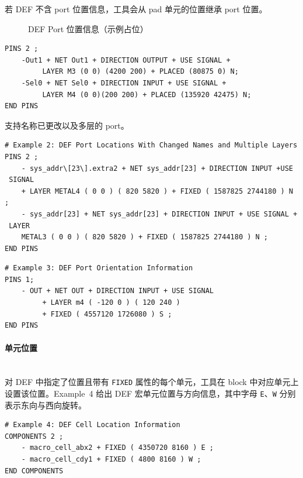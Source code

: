 \begin{noteBox}
若 DEF 不含 port 位置信息，工具会从 pad 单元的位置继承 port 位置。
\end{noteBox}

\begin{figure}[htbp]
\centering
{}
\caption{DEF Port 位置信息（示例占位）}
\label{ex:def-port-loc}
\end{figure}

\begin{lstlisting}
PINS 2 ;
    -Out1 + NET Out1 + DIRECTION OUTPUT + USE SIGNAL +
         LAYER M3 (0 0) (4200 200) + PLACED (80875 0) N;
    -Sel0 + NET Sel0 + DIRECTION INPUT + USE SIGNAL +
         LAYER M4 (0 0)(200 200) + PLACED (135920 42475) N;
END PINS
\end{lstlisting}

支持名称已更改以及多层的 port。

\begin{lstlisting}
# Example 2: DEF Port Locations With Changed Names and Multiple Layers
PINS 2 ;
    - sys_addr\[23\].extra2 + NET sys_addr[23] + DIRECTION INPUT +USE
 SIGNAL
    + LAYER METAL4 ( 0 0 ) ( 820 5820 ) + FIXED ( 1587825 2744180 ) N ;
    - sys_addr[23] + NET sys_addr[23] + DIRECTION INPUT + USE SIGNAL +
 LAYER
    METAL3 ( 0 0 ) ( 820 5820 ) + FIXED ( 1587825 2744180 ) N ;
END PINS
\end{lstlisting}

\begin{lstlisting}
# Example 3: DEF Port Orientation Information
PINS 1;
    - OUT + NET OUT + DIRECTION INPUT + USE SIGNAL
         + LAYER m4 ( -120 0 ) ( 120 240 )
         + FIXED ( 4557120 1726080 ) S ;
END PINS
\end{lstlisting}

\paragraph{单元位置}\mbox{}\\
对 DEF 中指定了位置且带有 \texttt{FIXED} 属性的每个单元，工具在 block 中对应单元上设置该位置。Example~4 给出 DEF 宏单元位置与方向信息，其中字母 \texttt{E}、\texttt{W} 分别表示东向与西向旋转。

\begin{lstlisting}
# Example 4: DEF Cell Location Information
COMPONENTS 2 ;
    - macro_cell_abx2 + FIXED ( 4350720 8160 ) E ;
    - macro_cell_cdy1 + FIXED ( 4800 8160 ) W ;
END COMPONENTS
\end{lstlisting}

